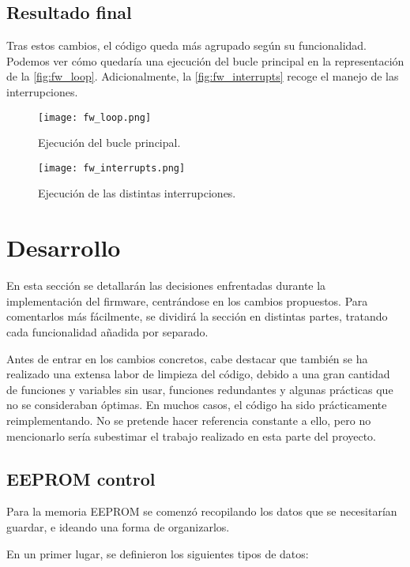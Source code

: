 \subsection{Resultado final}

Tras estos cambios, el código queda más agrupado según su funcionalidad. Podemos ver cómo quedaría una ejecución del bucle principal en la representación de la \autoref{fig:fw_loop}. Adicionalmente, la \autoref{fig:fw_interrupts} recoge el manejo de las interrupciones.

\begin{figure}
    \centering
    \texttt{[image: fw\_loop.png]}
    \caption{Ejecución del bucle principal.}
    \label{fig:fw_loop}
\end{figure}

\begin{figure}
    \centering
    \texttt{[image: fw\_interrupts.png]}
    \caption{Ejecución de las distintas interrupciones.}
    \label{fig:fw_interrupts}
\end{figure}

\section{Desarrollo}

En esta sección se detallarán las decisiones enfrentadas durante la implementación del firmware, centrándose en los cambios propuestos. Para comentarlos más fácilmente, se dividirá la sección en distintas partes, tratando cada funcionalidad añadida por separado.

Antes de entrar en los cambios concretos, cabe destacar que también se ha realizado una extensa labor de limpieza del código, debido a una gran cantidad de funciones y variables sin usar, funciones redundantes y algunas prácticas que no se consideraban óptimas. En muchos casos, el código ha sido prácticamente reimplementando. No se pretende hacer referencia constante a ello, pero no mencionarlo sería subestimar el trabajo realizado en esta parte del proyecto.

\subsection{EEPROM control}

Para la memoria EEPROM se comenzó recopilando los datos que se necesitarían guardar, e ideando una forma de organizarlos.

En un primer lugar, se definieron los siguientes tipos de datos:

